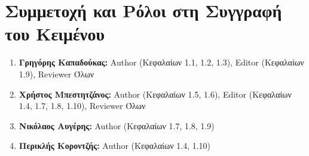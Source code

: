 \documentclass[12pt,a4paper]{article}
\begin{document}
\section{Συμμετοχή και Ρόλοι στη Συγγραφή του Κειμένου}
\begin{enumerate}
	\item \textbf{Γρηγόρης Καπαδούκας:} Author (Κεφαλαίων 1.1, 1.2, 1.3), Editor (Κεφαλαίων 1.9), Reviewer Όλων
	\item \textbf{Χρήστος Μπεστητζάνος:} Author (Κεφαλαίων 1.5, 1.6), Editor (Κεφαλαίων 1.4, 1.7, 1.8, 1.10), Reviewer Όλων
   	\item \textbf{Νικόλαος Αυγέρης:} Author (Κεφαλαίων 1.7, 1.8, 1.9)
	\item \textbf{Περικλής Κοροντζής:} Author (Κεφαλαίων 1.4, 1.10)
\end{enumerate}
\end{document}
